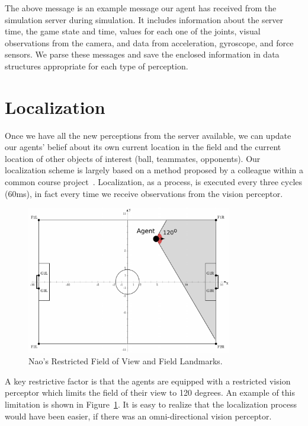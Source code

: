 \noindent
The above message is an example message our agent has received from the simulation server during simulation. It includes information about the server time, the game state and time, values for each one of the joints, visual observations from the camera, and data from acceleration, gyroscope, and force sensors. We parse these messages and save the enclosed information in data structures appropriate for each type of perception. 



\section{Localization}
Once we have all the new perceptions from the server available, we can update our agents' belief about its own current location in the field and the current location of other objects of interest (ball, teammates, opponents). Our localization scheme is largely based on a method proposed by a colleague within a common course project~\cite{Localization}. Localization, as a process, is executed every three cycles (60ms), in fact every time we receive observations from the vision perceptor. 

\begin{figure}[t!]
\centering
  \includegraphics[width=0.8\textwidth]{Chapter3/figures/LViewAngle.pdf}
  \caption{Nao's Restricted Field of View and Field Landmarks.} 
  \label{fig:fieldofview}
\end{figure}

A key restrictive factor is that the agents are equipped with a restricted vision perceptor which limits the field of their view to 120 degrees. An example of this limitation is shown in Figure~\ref{fig:fieldofview}. It is easy to realize that the localization process would have been easier, if there was an omni-directional vision perceptor.



